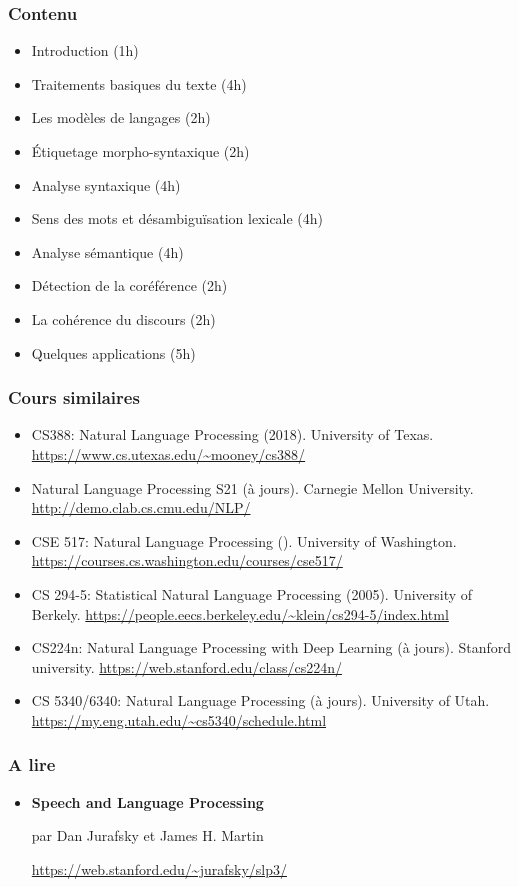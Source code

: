 \documentclass{beamer}
\begin{document}
\begin{frame}
\frametitle{Contenu}

\begin{itemize}
	\item Introduction (1h)
	\item Traitements basiques du texte (4h)
	\item Les modèles de langages (2h)
	\item Étiquetage morpho-syntaxique (2h)
	\item Analyse syntaxique (4h)
	\item Sens des mots et désambiguïsation lexicale (4h)
	\item Analyse sémantique (4h)
	\item Détection de la coréférence (2h)
	\item La cohérence du discours (2h)
	\item Quelques applications (5h)
\end{itemize}

\end{frame}

\begin{frame}
	\frametitle{Cours similaires}
	
	\begin{itemize}
		\item CS388: Natural Language Processing (2018). 
		University of Texas. 
		\url{https://www.cs.utexas.edu/~mooney/cs388/}
		
		\item Natural Language Processing S21 (à jours).
		Carnegie Mellon University. 
		\url{http://demo.clab.cs.cmu.edu/NLP/}
		
		\item CSE 517: Natural Language Processing ().
		University of Washington.
		\url{https://courses.cs.washington.edu/courses/cse517/}
		
		\item CS 294-5: Statistical Natural Language Processing (2005). 
		University of Berkely. 
		\url{https://people.eecs.berkeley.edu/~klein/cs294-5/index.html}
		
		\item CS224n: Natural Language Processing with Deep Learning (à jours).
		Stanford university.
		\url{https://web.stanford.edu/class/cs224n/}
		
		\item CS 5340/6340: Natural Language Processing (à jours). 
		University of Utah.
		\url{https://my.eng.utah.edu/~cs5340/schedule.html}
		
	\end{itemize}
	
\end{frame}

\begin{frame}
	\frametitle{A lire}
	
	\begin{itemize}
		\item \textbf{Speech and Language Processing} 
		
		par Dan Jurafsky et James H. Martin
		
		\url{https://web.stanford.edu/~jurafsky/slp3/}
	\end{itemize}
	
\end{frame}
\end{document}

